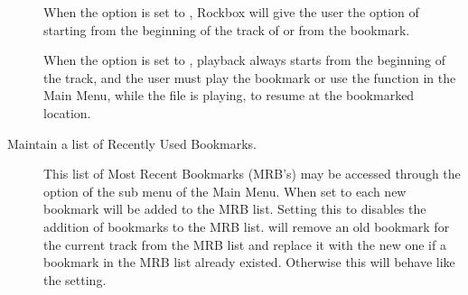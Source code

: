 \begin{description}
  When the  option is set to , Rockbox will
  give the user the option of starting from the beginning of the track
  of or from the bookmark. 

  When the  option is set to , playback always
  starts from the beginning of the track, and the user must play the bookmark
  or use the  function in the Main Menu, while the file
  is playing, to resume at the bookmarked location.
    
  \item [Maintain a list of Recently Used Bookmarks. ]

  This list of Most Recent Bookmarks (MRB's) may be accessed through the
   option of the  sub menu of the 
  Main Menu. When set to  each new bookmark will be added to the
  MRB list. Setting this to  disables the addition of bookmarks to
  the MRB list.  will remove an old bookmark for the current
  track from the MRB list and replace it with the new one if a bookmark in the
  MRB list already existed. Otherwise this will behave like the 
   setting.
  \end{description}
